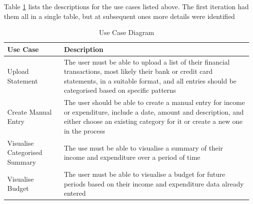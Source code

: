 Table \ref{tab:UseCaseDescriptions} lists the descriptions for the use cases
listed above. The first iteration had them all in a single table, but at
subsequent ones more details were identified
\begin{table}[!htb]
  \centering
  \begin{tabular}{|p{4cm}|p{12cm}|}
    \hline
    \textbf{Use Case}&\textbf{Description}\\
    \hline
    Upload Statement&The user must be able to upload a list of their
                     financial transactions, most likely their bank
                     or credit card statements, in a suitable format,
                     and all entries should be categorised based on 
                     specific patterns\\
    \hline
    Create Manual Entry&The user should be able to create a manual entry for
                        income or expenditure, include a date, amount and
                        description, and either choose an existing category for
                        it or create a new one in the process\\
    \hline
    Visualise Categorised Summary&The use must be able to visualise
                                  a summary of their income and expenditure
                                  over a period of time\\
    \hline
    Visualise Budget&The user must be able to visualise a budget for future
                     periods based on their income and expenditure data 
                     already entered\\
    \hline
  \end{tabular}
  \caption{Use Case Diagram} \label{tab:UseCaseDescriptions}
\end{table}


